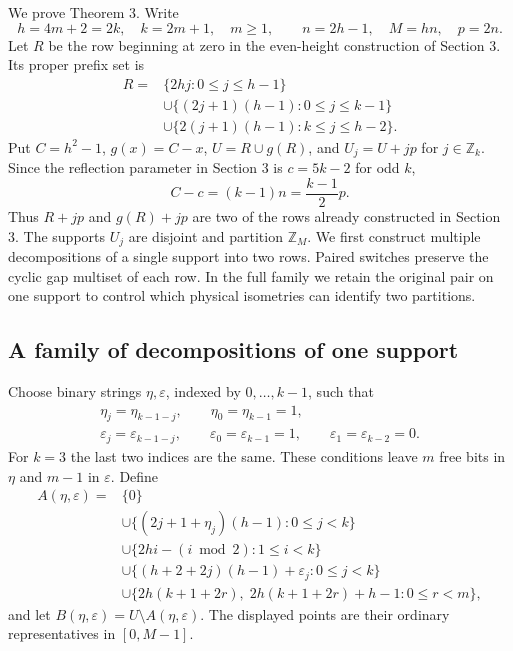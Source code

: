\documentclass[11pt,a4paper]{article}
\begin{document}
We prove Theorem 3. Write \[
 h=4m+2=2k,\quad k=2m+1,\quad m\geq1,\qquad
 n=2h-1,\quad M=hn,\quad p=2n.
\] Let \(R\) be the row beginning at zero in the even-height construction of Section 3. Its proper prefix set is \begin{equation}
\begin{split}
 R={}&\{2hj:0\leq j\leq h-1\}\\
 &\cup\{(2j+1)(h-1):0\leq j\leq k-1\}\\
 &\cup\{2(j+1)(h-1):k\leq j\leq h-2\}. 
\end{split}
\tag{D1}\label{eq:D1}
\end{equation} Put \(C=h^2-1\), \(g(x)=C-x\), \(U=R\cup g(R)\), and \(U_j=U+jp\) for \(j\in\mathbb Z_k\). Since the reflection parameter in Section 3 is \(c=5k-2\) for odd \(k\), \begin{equation}
C-c=(k-1)n=\frac{k-1}{2}p.
\tag{D2}\label{eq:D2}
\end{equation} Thus \(R+jp\) and \(g(R)+jp\) are two of the rows already constructed in Section 3. The supports \(U_j\) are disjoint and partition \(\mathbb Z_M\). We first construct multiple decompositions of a single support into two rows. Paired switches preserve the cyclic gap multiset of each row. In the full family we retain the original pair on one support to control which physical isometries can identify two partitions.

\hypertarget{a-family-of-decompositions-of-one-support}{%
\subsection{A family of decompositions of one support}\label{a-family-of-decompositions-of-one-support}}

Choose binary strings \(\eta,\varepsilon\), indexed by \(0,\ldots,k-1\), such that \begin{equation}
\begin{gathered}
 \eta_j=\eta_{k-1-j},\qquad \eta_0=\eta_{k-1}=1,\\
 \varepsilon_j=\varepsilon_{k-1-j},\qquad
 \varepsilon_0=\varepsilon_{k-1}=1,\qquad
 \varepsilon_1=\varepsilon_{k-2}=0. 
\end{gathered}
\tag{D3}\label{eq:D3}
\end{equation} For \(k=3\) the last two indices are the same. These conditions leave \(m\) free bits in \(\eta\) and \(m-1\) in \(\varepsilon\). Define \begin{equation}
\begin{split}
 A(\eta,\varepsilon)={}&\{0\}\\
 &\cup\{(2j+1+\eta_j)(h-1):0\leq j<k\}\\
 &\cup\{2hi-(i\bmod2):1\leq i<k\}\\
 &\cup\{(h+2+2j)(h-1)+\varepsilon_j:0\leq j<k\}\\
 &\cup\{2h(k+1+2r),\;2h(k+1+2r)+h-1:0\leq r<m\}, 
\end{split}
\tag{D4}\label{eq:D4}
\end{equation} and let \(B(\eta,\varepsilon)=U\setminus A(\eta,\varepsilon)\). The displayed points are their ordinary representatives in \([0,M-1]\).
\end{document}
